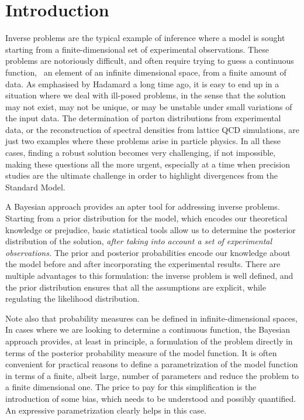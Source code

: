\section{Introduction}
\label{sec:Intro}

Inverse problems are the typical example of inference where a model is sought
starting from a finite-dimensional set of experimental observations. These
problems are notoriously difficult, and often require trying to guess a
continuous function, \ie\ an element of an infinite dimensional space, from a
finite amount of data. As emphasised by Hadamard a long time ago, it is easy to
end up in a situation where we deal with ill-posed problems, in the sense that
the solution may not exist, may not be unique, or may be unstable under small
variations of the input data. The determination of parton distributions from
experimental data, or the reconstruction of spectral densities from lattice QCD
simulations, are just two examples where these problems arise in particle
physics. In all these cases, finding a robust solution becomes very challenging,
if not impossible, making these questions all the more urgent, especially at a
time when precision studies are the ultimate challenge in order to highlight
divergences from the Standard Model. 

A Bayesian approach provides an apter tool for addressing inverse problems.
Starting from a prior distribution for the model, which encodes our theoretical
knowledge or prejudice, basic statistical tools allow us to determine the
posterior distribution of the solution, {\it after taking into account a set of
experimental observations.} The prior and posterior probabilities encode our
knowledge about the model before and after incorporating the experimental
results. There are multiple advantages to this formulation: the inverse problem
is well defined, and the prior distribution ensures that all the assumptions are
explicit, while regulating the likelihood distribution. 

Note also that probability measures can be defined in infinite-dimensional
spaces, In cases where we are looking to determine a continuous function, the
Bayesian approach provides, at least in principle, a formulation of the problem
directly in terms of the posterior probability measure of the model function. It
is often convenient for practical reasons to define a parametrization of the
model function in terms of a finite, albeit large, number of parameters and
reduce the problem to a finite dimensional one. The price to pay for this
simplification is the introduction of some bias, which needs to be understood
and possibly quantified. An expressive parametrization clearly helps in this
case. 

